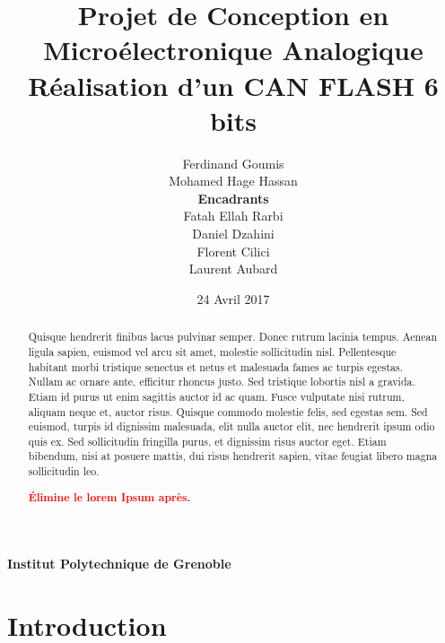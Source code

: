 \documentclass[11pt]{article}
\begin{document}
\title{\textbf{Projet de Conception en Micro\'electronique Analogique} \\ R\'ealisation d'un CAN FLASH 6 bits}
\author{Ferdinand Goumis \\ Mohamed Hage Hassan \medskip\\\medskip \textbf{Encadrants} \medskip \\ Fatah Ellah Rarbi \\ Daniel Dzahini \\ Florent Cilici \\ Laurent Aubard}
\date{24 Avril 2017}
\maketitle
\thispagestyle{empty}

\renewcommand{\abstractname}{Abstrait(Pr\'emabule)}

\begin{abstract}
Quisque hendrerit finibus lacus pulvinar semper.
Donec rutrum lacinia tempus. Aenean ligula sapien, euismod vel arcu sit amet,
molestie sollicitudin nisl. Pellentesque habitant morbi tristique senectus et netus et
malesuada fames ac turpis egestas. Nullam ac ornare ante, efficitur rhoncus justo.
Sed tristique lobortis nisl a gravida. Etiam id purus ut enim sagittis auctor id ac quam.
Fusce vulputate nisi rutrum, aliquam neque et, auctor risus. Quisque commodo molestie felis,
sed egestas sem. Sed euismod, turpis id dignissim malesuada, elit nulla auctor elit, nec hendrerit
ipsum odio quis ex. Sed sollicitudin fringilla purus, et dignissim risus auctor eget. Etiam bibendum,
nisi at posuere mattis, dui risus hendrerit sapien, vitae feugiat libero magna sollicitudin leo.

\begin{center}
  \textbf{\textcolor{red}{\'Elimine le lorem Ipsum apr\`es.}}
\end{center}

\end{abstract}

\vskip 7cm
\begin{center} \textbf{Institut Polytechnique de Grenoble} \end{center}

\clearpage

\tableofcontents
\clearpage

\section{Introduction}
\end{document}
